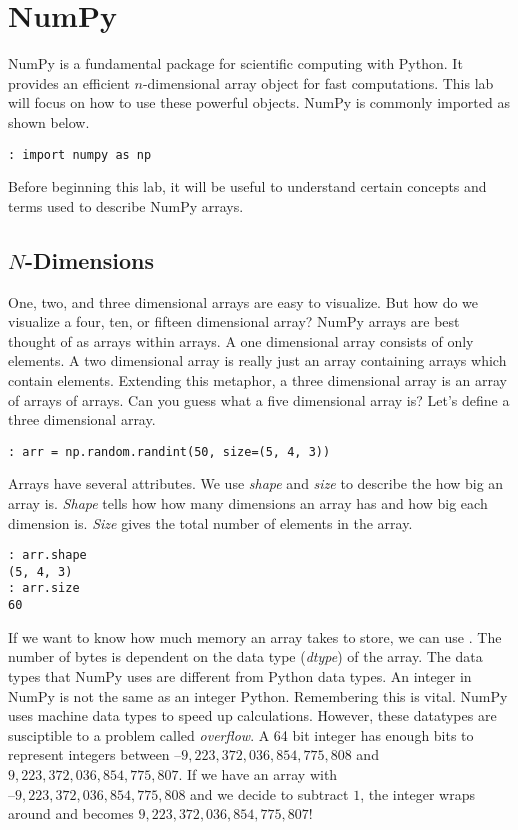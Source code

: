 \label{lab:Essentials2}


\section*{NumPy}
NumPy is a fundamental package for scientific computing with Python.  It provides an efficient $n$-dimensional array object for fast computations.  This lab will focus on how to use these powerful objects.  NumPy is commonly imported as shown below.

\begin{lstlisting}
: import numpy as np
\end{lstlisting}

Before beginning this lab, it will be useful to understand certain concepts and terms used to describe NumPy arrays.

\subsection*{$N$-Dimensions}
One, two, and three dimensional arrays are easy to visualize.  But how do we visualize a four, ten, or fifteen dimensional array?  NumPy arrays are best thought of as arrays within arrays.  A one dimensional array consists of only elements.  A two dimensional array is really just an array containing arrays which contain elements.  Extending this metaphor, a three dimensional array is an array of arrays of arrays.  Can you guess what a five dimensional array is?  Let's define a three dimensional array.

\begin{lstlisting}
: arr = np.random.randint(50, size=(5, 4, 3))
\end{lstlisting}

Arrays have several attributes.  We use \emph{shape} and \emph{size} to describe the how big an array is.  \emph{Shape} tells how how many dimensions an array has and how big each dimension is.  \emph{Size} gives the total number of elements in the array.

\begin{lstlisting}
: arr.shape
(5, 4, 3)
: arr.size
60
\end{lstlisting}

If we want to know how much memory an array takes to store, we can use .  The number of bytes is dependent on the data type (\emph{dtype}) of the array.  The data types that NumPy uses are different from Python data types.  An integer in NumPy is not the same as an integer Python.  Remembering this is vital.  NumPy uses machine data types to speed up calculations.  However, these datatypes are susciptible to a problem called \emph{overflow}.  A 64 bit integer has enough bits to represent integers between $–9,223,372,036,854,775,808$ and $9,223,372,036,854,775,807$.  If we have an array with $–9,223,372,036,854,775,808$ and we decide to subtract $1$, the integer wraps around and becomes $9,223,372,036,854,775,807$!  

